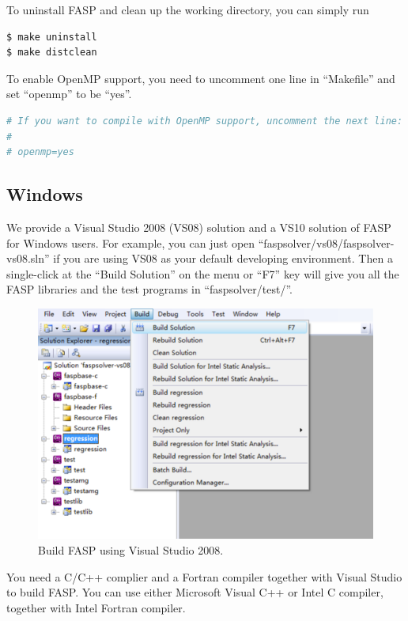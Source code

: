 \documentclass[11pt]{memoir}
\begin{document}
To uninstall FASP and clean up the working directory, you can simply run
%
\begin{lstlisting}[numbers=none]
$ make uninstall
$ make distclean
\end{lstlisting}
%
To enable OpenMP support, you need to uncomment one line in ``Makefile'' and set ``openmp'' to be ``yes''.
\begin{lstlisting}[numbers=none, language=sh]
# If you want to compile with OpenMP support, uncomment the next line:
#
# openmp=yes
\end{lstlisting}


\subsection{Windows}

We provide a Visual Studio 2008 (VS08) solution and a VS10 solution of FASP for Windows users. For example, you can just open ``faspsolver/vs08/faspsolver-vs08.sln'' if you are using VS08 as your default developing environment. Then a single-click at the ``Build Solution'' on the menu or ``F7'' key  will give you all the FASP libraries and the test programs in ``faspsolver/test/''.
\begin{figure}[htbp] %
   \centering
   \includegraphics[width=0.9\linewidth]{fig/build-fasp.pdf} 
   \caption{Build FASP using Visual Studio 2008.}
   \label{fig:build}
\end{figure}


\begin{snugshade}\noindent
You need a C/C++ complier and a Fortran compiler together with Visual Studio to build FASP. You can use either Microsoft Visual C++ or Intel C compiler, together with Intel Fortran compiler.
\end{snugshade}
\end{document}
